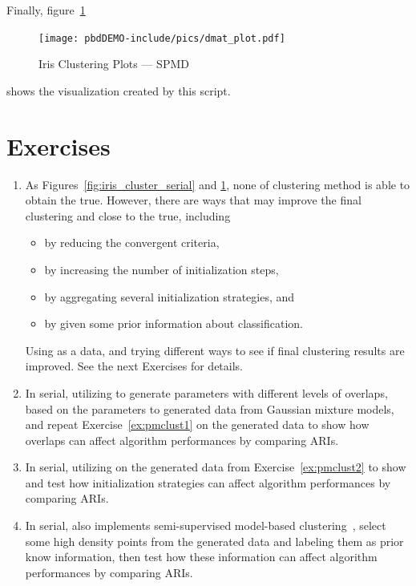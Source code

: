 Finally, figure~\ref{fig:iris_cluster_spmd}
\begin{figure}[h!bt]
  \centering
  \texttt{[image: pbdDEMO-include/pics/dmat\_plot.pdf]}
  \caption{Iris Clustering Plots --- SPMD}
  \label{fig:iris_cluster_spmd}
\end{figure}
shows the visualization created by this script.




\section{Exercises}
\label{sec:pmclust_exercise}

\begin{enumerate}[label=\thechapter-\arabic*]

\item
As Figures~\ref{fig:iris_cluster_serial} and \ref{fig:iris_cluster_spmd},
none of clustering method is able to obtain the true. However, there are
ways that may improve the final clustering and close to the true, including
\begin{itemize}
\item[1)] by reducing the convergent criteria,
\item[2)] by increasing the number of initialization steps,
\item[3)] by aggregating several initialization strategies, and
\item[4)] by given some prior information about classification.
\end{itemize}
Using  as a data, and trying different ways to see if
final clustering results are improved.
See the next Exercises for details.
\label{ex:pmclust1}

\item
In serial,
utilizing  to generate parameters with different levels of
overlaps, based on the parameters to generated data from Gaussian mixture
models, and repeat Exercise~\ref{ex:pmclust1} on the generated data
to show how overlaps can affect algorithm performances by comparing ARIs.
\label{ex:pmclust2}

\item
In serial,
utilizing  on the generated data from Exercise~\ref{ex:pmclust2}
to show and test how initialization strategies can affect algorithm
performances by comparing ARIs.

\item
In serial,
 also implements semi-supervised model-based
clustering~, select some high density points
from the generated data and labeling them as prior know information, then
test how these information can affect algorithm performances
by comparing ARIs.

\end{enumerate}

